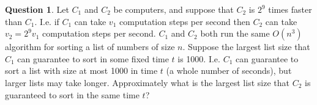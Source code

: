\documentclass{article}
\theoremstyle{definition}
\newtheorem{Q}{Question}
\begin{document}
\begin{Q}
Let $C_1$ and $C_2$ be computers, and suppose that $C_2$ is $2^9$ times faster than $C_1$. I.e. if $C_1$ can take $v_1$ computation steps per second then $C_2$ can take $v_2=2^9v_1$ computation steps per second. $C_1$ and $C_2$ both run the same $O(n^3)$ algorithm for sorting a list of numbers of size $n$. Suppose the largest list size that $C_1$ can guarantee to sort in some fixed time $t$ is 1000. I.e. $C_1$ can guarantee to sort a list with size at most 1000 in time $t$ (a whole number of seconds), but larger lists may take longer. Approximately what is the largest list size that $C_2$ is guaranteed to sort in the same time $t$?  
\end{Q}
\begin{comment}
\textbf{Solution}
Let $n_i$ be the largest list size that $C_i$ is guaranteed to sort within time $t$, for $i\in\{1,2\}$. Since the algorithm is $O(n^3)$, there is a constant $c$ such that the run time on a list of length $n$ is at most $cn^3$. The number of computation steps $C_i$ can take in time $t$ is $v_it$. So $n_i = \max \{n : cn^3\leq v_it\}$. I.e. $n_1 = \lfloor (\frac{v_1t}{c})^{\frac{1}{3}} \rfloor$, and $n_2 = \lfloor (\frac{v_2t}{c})^{\frac{1}{3}} \rfloor$. But $v_2 = 2^9v_1$, and so $n_2 = \lfloor (\frac{2^9v_1t}{c})^{\frac{1}{3}} \rfloor \approx 2^3\lfloor (\frac{v_1t}{c})^{\frac{1}{3}} \rfloor = 2^3n_1$. We are told $n_1 = 1000$, so $n_2\approx 2^3\times 1000 = 8000$. 

  
\end{comment}
\end{document}
